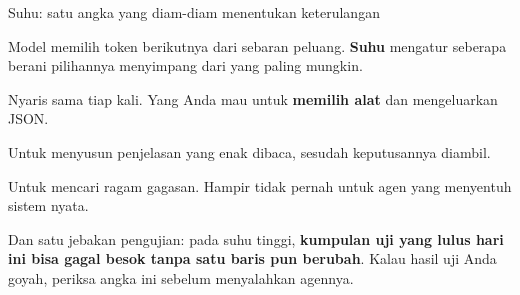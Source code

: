\documentclass[aspectratio=169,11pt,t]{beamer}
\begin{document}
\begin{frame}[shrink=25]{Suhu: satu angka yang diam-diam menentukan keterulangan}
{\fontsize{9.4}{12.6}\selectfont\color{fg2}Model memilih token berikutnya dari sebaran peluang. \textbf{Suhu} mengatur seberapa berani pilihannya menyimpang dari yang paling mungkin.\par}\vskip 4pt
\begin{minipage}[t]{0.3253\textwidth}
\begin{icardgood}
Nyaris sama tiap kali. Yang Anda mau untuk \textbf{memilih alat} dan mengeluarkan JSON.
\end{icardgood}
\end{minipage}%
\hfill
\begin{minipage}[t]{0.3253\textwidth}
\begin{icard}
Untuk menyusun penjelasan yang enak dibaca, sesudah keputusannya diambil.
\end{icard}
\end{minipage}%
\hfill
\begin{minipage}[t]{0.3253\textwidth}
\begin{icardbad}
Untuk mencari ragam gagasan. Hampir tidak pernah untuk agen yang menyentuh sistem nyata.
\end{icardbad}
\end{minipage}%
\begin{iband}[signal]
Dan satu jebakan pengujian: pada suhu tinggi, \textbf{kumpulan uji yang lulus hari ini bisa gagal besok tanpa satu baris pun berubah}. Kalau hasil uji Anda goyah, periksa angka ini sebelum menyalahkan agennya.
\end{iband}
\end{frame}
\end{document}

